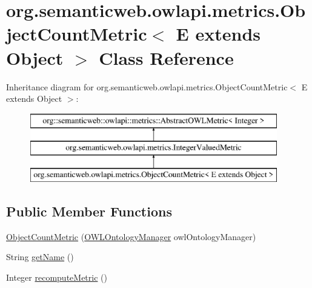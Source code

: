 \hypertarget{classorg_1_1semanticweb_1_1owlapi_1_1metrics_1_1_object_count_metric_3_01_e_01extends_01_object_01_4}{\section{org.\-semanticweb.\-owlapi.\-metrics.\-Object\-Count\-Metric$<$ E extends Object $>$ Class Reference}
\label{classorg_1_1semanticweb_1_1owlapi_1_1metrics_1_1_object_count_metric_3_01_e_01extends_01_object_01_4}
}
Inheritance diagram for org.\-semanticweb.\-owlapi.\-metrics.\-Object\-Count\-Metric$<$ E extends Object $>$\-:\begin{figure}[H]
\begin{center}
\leavevmode
\includegraphics[height=3.000000cm]{classorg_1_1semanticweb_1_1owlapi_1_1metrics_1_1_object_count_metric_3_01_e_01extends_01_object_01_4}
\end{center}
\end{figure}
\subsection*{Public Member Functions}
\begin{DoxyCompactItemize}
\item 
\hyperlink{classorg_1_1semanticweb_1_1owlapi_1_1metrics_1_1_object_count_metric_3_01_e_01extends_01_object_01_4_ab63582e64054cda93ee6c2d2f6484a2b}{Object\-Count\-Metric} (\hyperlink{interfaceorg_1_1semanticweb_1_1owlapi_1_1model_1_1_o_w_l_ontology_manager}{O\-W\-L\-Ontology\-Manager} owl\-Ontology\-Manager)
\item 
String \hyperlink{classorg_1_1semanticweb_1_1owlapi_1_1metrics_1_1_object_count_metric_3_01_e_01extends_01_object_01_4_abfa6219d3779fb274890a8a340b1327a}{get\-Name} ()
\item 
Integer \hyperlink{classorg_1_1semanticweb_1_1owlapi_1_1metrics_1_1_object_count_metric_3_01_e_01extends_01_object_01_4_a51d54f7db575c8502f76ce65329dbb90}{recompute\-Metric} ()
\end{DoxyCompactItemize}

